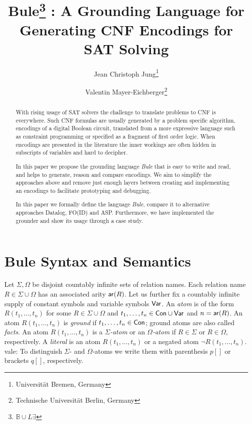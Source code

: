 \documentclass{article}
\title{ Bule\footnote{$\mathbb{B}\cup L \exists$} : A Grounding Language for Generating CNF Encodings for SAT Solving}
\author{Jean Christoph Jung\footnote{Universität Bremen, Germany} \and Valentin Mayer-Eichberger\footnote{Technische Universit\"at Berlin, Germany} \and 
}
\newcommand{\vale}[1]{\textcolor[rgb]{0.00,0.00,0.54296875}{vale: #1} }
\begin{document}
\maketitle

\begin{abstract}
    With rising usage of SAT solvers the challenge to translate problems to CNF
    is everywhere. Such  CNF formulas are usually generated by a problem
    specific algorithm, encodings of a digital Boolean circuit, translated from
    a more expressive language such as constraint programming or specified as a
    fragment of first order logic. When encodings are  presented in the
    literature the inner workings are often hidden in subscripts of variables
    and hard to decipher.

    In this paper we propose the grounding language \emph{Bule} that is easy to
    write and read, and helps to generate, reason and compare encodings. We aim
    to simplify the approaches above and remove just enough layers between
    creating and implementing an encodings to facilitate prototyping and
    debugging. 

    In this paper we formally define the language \emph{Bule}, compare it to
    alternative approaches Datalog, FO(ID) and ASP. Furthermore, we have
    implemented the grounder and show its usage through a case study.
\end{abstract}

\section{Bule Syntax and Semantics}

Let $\Sigma,\Omega$ be disjoint countably infinite sets of relation
names. Each relation name $R\in \Sigma\cup\Omega$ has an associated
arity $\mathsf{ar}(R)$. Let us further fix a countably infinite supply of
constant symbols  and variable symbols $\mathsf{Var}$. An
\emph{atom} is of the form $R(t_1,\ldots,t_n)$ for some $R\in
\Sigma\cup\Omega$ and $t_1,\ldots,t_n\in\mathsf{Con}\cup\mathsf{Var}$ and
$n=\mathsf{ar}(R)$. An atom $R(t_1,\ldots,t_n)$ is \emph{ground} if
$t_1,\ldots,t_n\in\mathsf{Con}$; ground atoms are also called
\emph{facts}. An atom $R(t_1,\ldots,t_n)$ is a \emph{$\Sigma$-atom} or
an \emph{$\Omega$-atom} if $R\in \Sigma$ or $R\in \Omega$,
respectively. A \emph{literal} is an atom $R(t_1,\ldots,t_n)$ or a negated atom
$\neg R(t_1,\ldots,t_n)$. \vale{To distinguish $\Sigma$- and $\Omega$-atoms we
write them with parenthesis $p[]$ or brackets $q[]$, respectively. }
\end{document}
